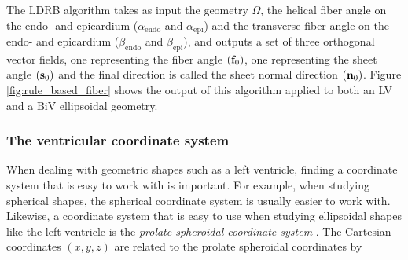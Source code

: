 The LDRB algorithm takes as
input the geometry $\Omega$, the helical fiber angle on the endo- and
epicardium ($\alpha_{\mathrm{endo}}$ and $\alpha_{\mathrm{epi}}$) and
the transverse fiber angle on the endo- and epicardium
($\beta_{\mathrm{endo}}$ and $\beta_{\mathrm{epi}}$), and outputs a
set of three orthogonal vector fields, one representing the fiber
angle $(\mathbf{f}_0)$, one representing the sheet angle $(\mathbf{s}_0)$ and the final
direction is called the sheet normal direction $(\mathbf{n}_0)$. Figure
\ref{fig:rule_based_fiber} shows the output of this algorithm applied
to both an LV and a BiV ellipsoidal geometry. 

\subsubsection{The ventricular coordinate system}

When dealing with geometric shapes such as a left ventricle, finding a
coordinate system that is easy to work with is important. For
example, when studying spherical shapes, the spherical coordinate system is
usually easier to work with. Likewise, a coordinate system that is
easy to use when studying ellipsoidal shapes like the left ventricle is
the \emph{prolate spheroidal coordinate system} \cite{hunter1996kd}. 
The Cartesian coordinates $(x,y,z)$ are related to the prolate
spheroidal coordinates by


